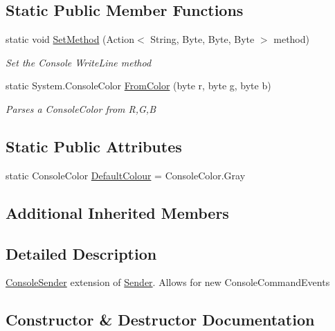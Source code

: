 \subsection*{Static Public Member Functions}
\begin{DoxyCompactItemize}
\item 
static void \hyperlink{class_o_t_a_1_1_command_1_1_console_sender_a9db3656943a76164ad5501b9d67fadbe}{Set\+Method} (Action$<$ String, Byte, Byte, Byte $>$ method)
\begin{DoxyCompactList}\small\item\em Set the Console Write\+Line method \end{DoxyCompactList}\item 
static System.\+Console\+Color \hyperlink{class_o_t_a_1_1_command_1_1_console_sender_af66df3ce3746b40cd12a917d9e789987}{From\+Color} (byte r, byte g, byte b)
\begin{DoxyCompactList}\small\item\em Parses a Console\+Color from R,G,B \end{DoxyCompactList}\end{DoxyCompactItemize}
\subsection*{Static Public Attributes}
\begin{DoxyCompactItemize}
\item 
static Console\+Color \hyperlink{class_o_t_a_1_1_command_1_1_console_sender_a959ea02675496cb1bc5e32d81ea5ba7b}{Default\+Colour} = Console\+Color.\+Gray
\end{DoxyCompactItemize}
\subsection*{Additional Inherited Members}


\subsection{Detailed Description}
\hyperlink{class_o_t_a_1_1_command_1_1_console_sender}{Console\+Sender} extension of \hyperlink{class_o_t_a_1_1_command_1_1_sender}{Sender}. Allows for new Console\+Command\+Events 



\subsection{Constructor \& Destructor Documentation}
\hypertarget{class_o_t_a_1_1_command_1_1_console_sender_a0392fc06bb67e8870eeb541229f21d95}{}
